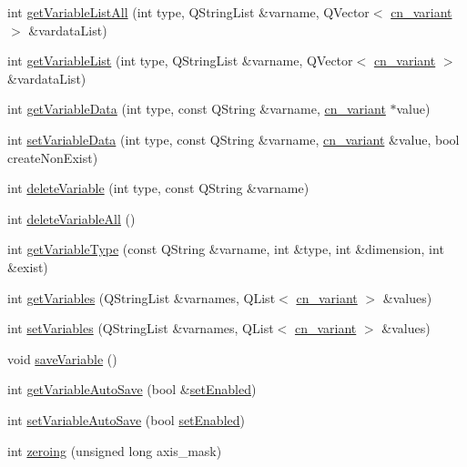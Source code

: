\begin{DoxyCompactItemize}
int \hyperlink{classCUIApp_a925db4d1b2bbd1afb9444c0e0107e8b0}{get\-Variable\-List\-All} (int type, Q\-String\-List \&varname, Q\-Vector$<$ \hyperlink{structcn__variant}{cn\-\_\-variant} $>$ \&vardata\-List)
\item 
int \hyperlink{classCUIApp_aa91bb1b3ee8cd64c045070501febc093}{get\-Variable\-List} (int type, Q\-String\-List \&varname, Q\-Vector$<$ \hyperlink{structcn__variant}{cn\-\_\-variant} $>$ \&vardata\-List)
\item 
int \hyperlink{classCUIApp_a2e1f43703c1671c83597eb4c49fcdb84}{get\-Variable\-Data} (int type, const Q\-String \&varname, \hyperlink{structcn__variant}{cn\-\_\-variant} $\ast$value)
\item 
int \hyperlink{classCUIApp_a1278c6736ec4e320ded37fcf47c7f947}{set\-Variable\-Data} (int type, const Q\-String \&varname, \hyperlink{structcn__variant}{cn\-\_\-variant} \&value, bool create\-Non\-Exist)
\item 
int \hyperlink{classCUIApp_ab3516417e2cea5be658322391350312e}{delete\-Variable} (int type, const Q\-String \&varname)
\item 
int \hyperlink{classCUIApp_ad515e95f6925fb50d6945baee291b017}{delete\-Variable\-All} ()
\item 
int \hyperlink{classCUIApp_aa79bafb099375e6dd3abc597282a5637}{get\-Variable\-Type} (const Q\-String \&varname, int \&type, int \&dimension, int \&exist)
\item 
int \hyperlink{classCUIApp_af85b9d32033d3eb9fccf453d074e3be8}{get\-Variables} (Q\-String\-List \&varnames, Q\-List$<$ \hyperlink{structcn__variant}{cn\-\_\-variant} $>$ \&values)
\item 
int \hyperlink{classCUIApp_aa8642ecf51f34f93073e5708586ad56c}{set\-Variables} (Q\-String\-List \&varnames, Q\-List$<$ \hyperlink{structcn__variant}{cn\-\_\-variant} $>$ \&values)
\item 
void \hyperlink{classCUIApp_ad06f7d4fe267316a5f408b20b380fc3e}{save\-Variable} ()
\item 
int \hyperlink{classCUIApp_ac406cc3f26f1b415e145cd0bee60b46e}{get\-Variable\-Auto\-Save} (bool \&\hyperlink{classCUIApp_a0bb9aaecc950f991d3ecc69e5895e9e6}{set\-Enabled})
\item 
int \hyperlink{classCUIApp_a3c0ac9e02ec745c05658c8ab58b8bc02}{set\-Variable\-Auto\-Save} (bool \hyperlink{classCUIApp_a0bb9aaecc950f991d3ecc69e5895e9e6}{set\-Enabled})
\item 
int \hyperlink{classCUIApp_a64d3d2e86624b51e5f990ac73b85f9ec}{zeroing} (unsigned long axis\-\_\-mask)
\item 

\end{DoxyCompactItemize}
